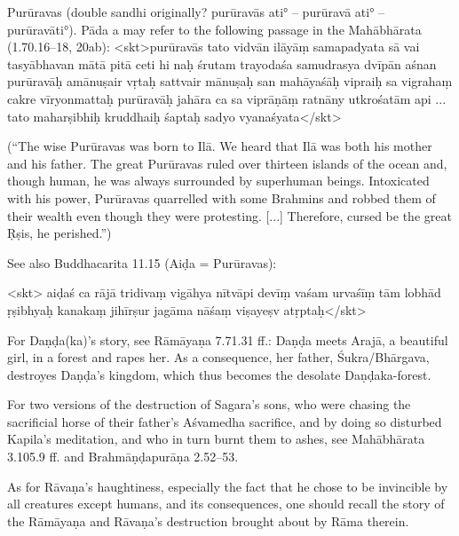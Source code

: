 { Purūravas (double sandhi originally? purūravās ati° -- purūravā ati° -- purūravāti°).         Pāda a may refer to the following passage in the Mahābhārata (1.70.16--18, 20ab):         
                                  <skt>purūravās tato vidvān ilāyāṃ samapadyata\danda
                                  sā vai tasyābhavan mātā pitā ceti hi naḥ śrutam\twodanda
                                  trayodaśa samudrasya dvīpān aśnan purūravāḥ\danda
                                  amānuṣair vṛtaḥ sattvair mānuṣaḥ san mahāyaśāḥ\twodanda
                                  vipraiḥ sa vigrahaṃ cakre vīryonmattaḥ purūravāḥ\danda
                                  jahāra ca sa viprāṇāṃ ratnāny utkrośatām api\twodanda
                                         ... 
                                  tato maharṣibhiḥ kruddhaiḥ śaptaḥ sadyo vyanaśyata\danda</skt>         

                         (``The wise Purūravas was born to Ilā. We heard that Ilā                                  was both his mother and his father.                             The great Purūravas ruled over thirteen islands of the ocean                            and, though human, he was always surrounded by superhuman beings.                            Intoxicated with his power, Purūravas quarrelled with some Brahmins                              and robbed them of their wealth even though they were protesting. [...]                            Therefore, cursed be the great Ṛṣis, he perished.'')         

         See also Buddhacarita 11.15 (Aiḍa = Purūravas):

                 <skt> aiḍaś ca rājā tridivaṃ vigāhya
                          nītvāpi devīṃ vaśam urvaśīṃ tām\danda
                       lobhād ṛṣibhyaḥ kanakaṃ jihīrṣur  
                         jagāma nāśaṃ viṣayeṣv atṛptaḥ\twodanda</skt>         

                 For Daṇḍa(ka)'s story, see Rāmāyaṇa 7.71.31 ff.:                 Daṇḍa meets Arajā, a beautiful girl, in a forest and rapes her. As a consequence, her father, Śukra/Bhārgava,                 destroyes Daṇḍa's kingdom, which thus becomes the desolate Daṇḍaka-forest.                     

For two versions of the destruction of                 Sagara's sons, who were chasing the sacrificial horse of their father's Aśvamedha sacrifice,                 and by doing so disturbed Kapila's meditation, and who in turn burnt them to ashes,                 see Mahābhārata 3.105.9 ff. and Brahmāṇḍapurāṇa 2.52--53.                 

                 As for Rāvaṇa's haughtiness,                 especially the fact that he chose to be invincible by all creatures except humans,                 and its consequences,                 one should recall the story of the Rāmāyaṇa and Rāvaṇa's destruction brought about by Rāma therein. }





